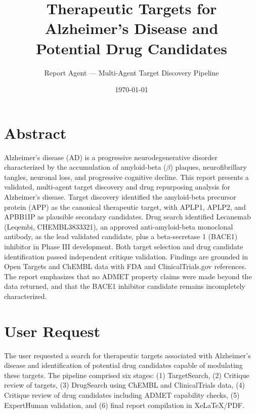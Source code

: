 \documentclass{article}
\title{\textbf{Therapeutic Targets for Alzheimer's Disease and\\ Potential Drug Candidates}}
\author{Report Agent --- Multi-Agent Target Discovery Pipeline}
\date{\today}
\begin{document}
\maketitle

\section*{Abstract}
Alzheimer's disease (AD) is a progressive neurodegenerative disorder characterized by the accumulation of amyloid-beta ($\beta$) plaques, neurofibrillary tangles, neuronal loss, and progressive cognitive decline. This report presents a validated, multi-agent target discovery and drug repurposing analysis for Alzheimer's disease. Target discovery identified the amyloid-beta precursor protein (APP) as the canonical therapeutic target, with APLP1, APLP2, and APBB1IP as plausible secondary candidates. Drug search identified Lecanemab (Leqembi, CHEMBL3833321), an approved anti-amyloid-beta monoclonal antibody, as the lead validated candidate, plus a beta-secretase 1 (BACE1) inhibitor in Phase III development. Both target selection and drug candidate identification passed independent critique validation. Findings are grounded in Open Targets and ChEMBL data with FDA and ClinicalTrials.gov references. The report emphasizes that no ADMET property claims were made beyond the data returned, and that the BACE1 inhibitor candidate remains incompletely characterized.

\section{User Request}
The user requested a search for therapeutic targets associated with Alzheimer's disease and identification of potential drug candidates capable of modulating these targets. The pipeline comprised six stages: (1) TargetSearch, (2) Critique review of targets, (3) DrugSearch using ChEMBL and ClinicalTrials data, (4) Critique review of drug candidates including ADMET capability checks, (5) ExpertHuman validation, and (6) final report compilation in XeLaTeX/PDF.
\end{document}
